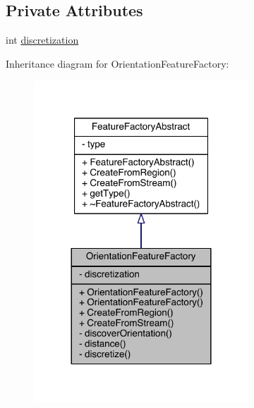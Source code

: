 \subsection*{Private Attributes}
\begin{DoxyCompactItemize}
\item 
int \hyperlink{class_orientation_feature_factory_abcd8932fe77877dff6657e4070882015}{discretization}
\end{DoxyCompactItemize}


Inheritance diagram for Orientation\+Feature\+Factory\+:\nopagebreak
\begin{figure}[H]
\begin{center}
\leavevmode
\includegraphics[width=228pt]{class_orientation_feature_factory__inherit__graph}
\end{center}
\end{figure}



